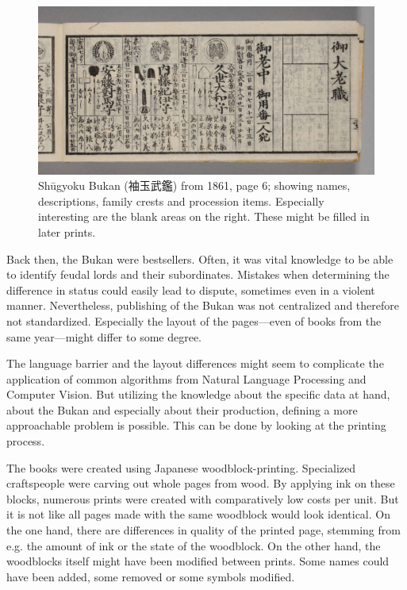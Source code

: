 \documentclass{ltjarticle}
\begin{document}
\begin{figure}
    \centering
    \includegraphics[width=\textwidth]{200019500_00006.jpg}
    \caption[Shūgyoku Bukan (袖玉武鑑), page 6]{Shūgyoku Bukan (袖玉武鑑) from 1861, page 6; showing names, descriptions, family crests and procession items. Especially interesting are the blank areas on the right. These might be filled in later prints.}
    \label{fig:shuugyokubukan006}
\end{figure}

Back then, the Bukan were bestsellers. Often, it was vital knowledge to be able to identify feudal lords and their subordinates. Mistakes when determining the difference in status could easily lead to dispute, sometimes even in a violent manner.\cite{dower1990elements} Nevertheless, publishing of the Bukan was not centralized and therefore not standardized. Especially the layout of the pages---even of books from the same year---might differ to some degree.

The language barrier and the layout differences might seem to complicate the application of common algorithms from Natural Language Processing and Computer Vision. But utilizing the knowledge about the specific data at hand, about the Bukan and especially about their production, defining a more approachable problem is possible. This can be done by looking at the printing process.

The books were created using Japanese woodblock-printing. Specialized craftspeople were carving out whole pages from wood. By applying ink on these blocks, numerous prints were created with comparatively low costs per unit. But it is not like all pages made with the same woodblock would look identical. On the one hand, there are differences in quality of the printed page, stemming from e.g. the amount of ink or the state of the woodblock. On the other hand, the woodblocks itself might have been modified between prints. Some names could have been added, some removed or some symbols modified.
\end{document}

